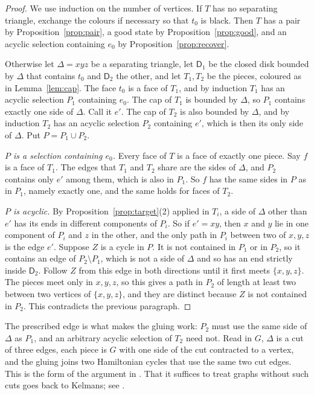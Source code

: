 \documentclass[10pt]{amsart}
\numberwithin{equation}{section}
\theoremstyle{definition}
\theoremstyle{remark}
\newcommand{\T}{T}
\begin{document}
\begin{proof}
We use induction on the number of vertices.
If $\T$ has no separating triangle, exchange the colours if necessary so that $t_0$ is black.
Then $\T$ has a pair by Proposition~\ref{prop:pair}, a good state by Proposition~\ref{prop:good}, and an acyclic selection containing $e_0$ by Proposition~\ref{prop:recover}.

Otherwise let $\Delta=xyz$ be a separating triangle, let $\mathsf{D}_1$ be the closed disk bounded by $\Delta$ that contains $t_0$ and $\mathsf{D}_2$ the other, and let $\T_1,\T_2$ be the pieces, coloured as in Lemma~\ref{lem:cap}.
The face $t_0$ is a face of $\T_1$, and by induction $\T_1$ has an acyclic selection $P_1$ containing $e_0$.
The cap of $\T_1$ is bounded by $\Delta$, so $P_1$ contains exactly one side of $\Delta$. Call it $e'$.
The cap of $\T_2$ is also bounded by $\Delta$, and by induction $\T_2$ has an acyclic selection $P_2$ containing $e'$, which is then its only side of $\Delta$.
Put $P=P_1\cup P_2$.

\emph{$P$ is a selection containing $e_0$.}
Every face of $\T$ is a face of exactly one piece. Say $f$ is a face of $\T_1$.
The edges that $\T_1$ and $\T_2$ share are the sides of $\Delta$, and $P_2$ contains only $e'$ among them, which is also in $P_1$.
So $f$ has the same sides in $P$ as in $P_1$, namely exactly one, and the same holds for faces of $\T_2$.

\emph{$P$ is acyclic.}
By Proposition~\ref{prop:target}(2) applied in $\T_i$, a side of $\Delta$ other than $e'$ has its ends in different components of $P_i$.
So if $e'=xy$, then $x$ and $y$ lie in one component of $P_i$ and $z$ in the other, and the only path in $P_i$ between two of $x,y,z$ is the edge $e'$.
Suppose $Z$ is a cycle in $P$.
It is not contained in $P_1$ or in $P_2$, so it contains an edge of $P_2\setminus P_1$, which is not a side of $\Delta$ and so has an end strictly inside $\mathsf{D}_2$.
Follow $Z$ from this edge in both directions until it first meets $\{x,y,z\}$.
The pieces meet only in $x,y,z$, so this gives a path in $P_2$ of length at least two between two vertices of $\{x,y,z\}$, and they are distinct because $Z$ is not contained in $P_2$.
This contradicts the previous paragraph.
\end{proof}

The prescribed edge is what makes the gluing work: $P_2$ must use the same side of $\Delta$ as $P_1$, and an arbitrary acyclic selection of $\T_2$ need not.
Read in $G$, $\Delta$ is a cut of three edges, each piece is $G$ with one side of the cut contracted to a vertex, and the gluing joins two Hamiltonian cycles that use the same two cut edges. This is the form of the argument in \cite[Appendix~C]{Li2026}.
That it suffices to treat graphs without such cuts goes back to Kelmans; see \cite[Section~5]{Alt2016}.
\end{document}
